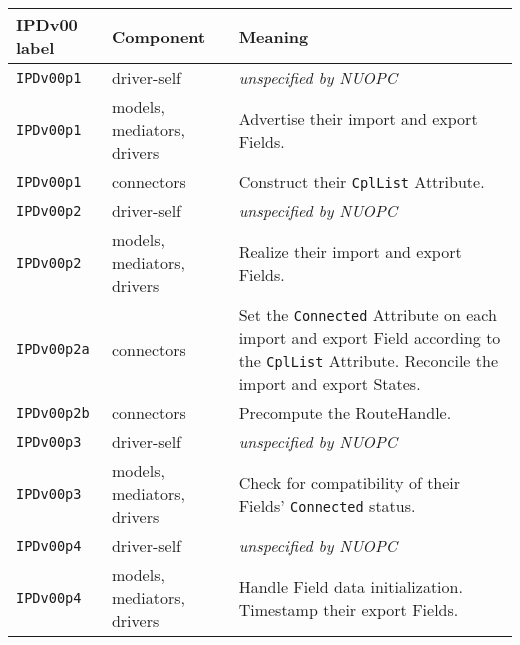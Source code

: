 \vspace*{2ex}
\begin{longtable}[h]{|p{35mm}|p{4cm}|p{6cm}|}
     \hline\hline
     {\bf IPDv00 label} & {\bf Component} & {\bf Meaning}\\
     \hline\hline
     {\tt IPDv00p1} & driver-self                 & {\em unspecified by NUOPC}\\ \hline
     {\tt IPDv00p1} & models, mediators, drivers  & Advertise their import and export Fields.\\ \hline
     {\tt IPDv00p1} & connectors                  & Construct their {\tt CplList} Attribute.\\ \hline
     {\tt IPDv00p2} & driver-self                 & {\em unspecified by NUOPC}\\ \hline
     {\tt IPDv00p2} & models, mediators, drivers  & Realize their import and export Fields.\\ \hline
     {\tt IPDv00p2a}& connectors                  & Set the {\tt Connected} Attribute on each import and export Field according to the {\tt CplList} Attribute. Reconcile the import and export States.\\ \hline
     {\tt IPDv00p2b}& connectors                  & Precompute the RouteHandle.\\ \hline
     {\tt IPDv00p3} & driver-self                 & {\em unspecified by NUOPC}\\ \hline
     {\tt IPDv00p3} & models, mediators, drivers  & Check for compatibility of their Fields' {\tt Connected} status.\\ \hline
     {\tt IPDv00p4} & driver-self                 & {\em unspecified by NUOPC}\\ \hline
     {\tt IPDv00p4} & models, mediators, drivers  & Handle Field data initialization. Timestamp their export Fields.\\
     \hline\hline
\end{longtable}

